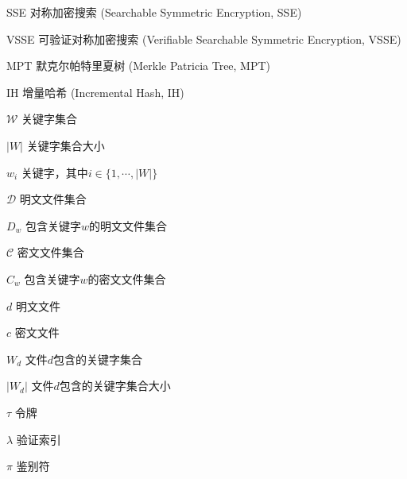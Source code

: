 \begin{denotation}[3cm]
\item[SSE] 对称加密搜索 (Searchable Symmetric Encryption, SSE)
\item[VSSE] 可验证对称加密搜索 (Verifiable Searchable Symmetric Encryption, VSSE)
\item[MPT] 默克尔帕特里夏树 (Merkle Patricia Tree, MPT)
\item[IH] 增量哈希 (Incremental Hash, IH)
\item[$\mathcal{W}$] 关键字集合
\item[$|W|$] 关键字集合大小
\item[$w_i$ ] 关键字，其中$i \in \{1, \cdots, |W|\}$
\item[$\mathcal{D}$] 明文文件集合
\item[$D_{w}$] 包含关键字$w$的明文文件集合
\item[$\mathcal{C}$] 密文文件集合
\item[$C_{w}$] 包含关键字$w$的密文文件集合
\item[$d$] 明文文件
\item[$c$] 密文文件
\item[$W_d$] 文件$d$包含的关键字集合
\item[$|W_d|$] 文件$d$包含的关键字集合大小

\item[$\tau$]	令牌
\item[$\lambda$] 验证索引
\item[$\pi$] 鉴别符
\end{denotation}

